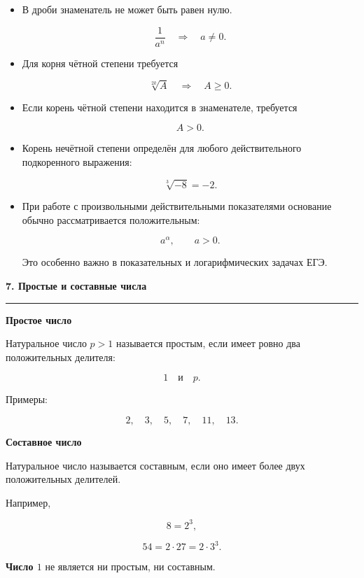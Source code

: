 \documentclass[a4paper,12pt]{article}
\newcommand{\MainSection}[1]{%
  \vspace{0.7em}
  {\Large\bfseries\color{darkaccent}#1\par}
  \vspace{0.25em}
  {\color{accent}\rule{\linewidth}{0.6pt}}
  \vspace{0.5em}
}
\newcommand{\SubSection}[1]{%
  \vspace{0.5em}
  {\large\bfseries\color{accent}#1\par}
  \vspace{0.2em}
}
\newcommand{\important}[1]{\textbf{\color{darkaccent}#1}}
\begin{document}
\begin{itemize}

\item
В дроби знаменатель не может быть равен нулю.

\[
\frac1{a^n}
\quad\Longrightarrow\quad
a\ne0.
\]

\item
Для корня чётной степени требуется

\[
\sqrt[2k]{A}
\quad\Longrightarrow\quad
A\ge0.
\]

\item
Если корень чётной степени находится в знаменателе, требуется

\[
A>0.
\]

\item
Корень нечётной степени определён для любого действительного
подкоренного выражения:

\[
\sqrt[3]{-8}=-2.
\]

\item
При работе с произвольными действительными показателями
основание обычно рассматривается положительным:

\[
a^\alpha,
\qquad a>0.
\]

Это особенно важно в показательных и логарифмических задачах ЕГЭ.

\end{itemize}


\MainSection{7. Простые и составные числа}

\SubSection{Простое число}

Натуральное число \(p>1\) называется простым, если имеет ровно два
положительных делителя:

\[
1
\quad\text{и}\quad
p.
\]

Примеры:

\[
2,\quad3,\quad5,\quad7,\quad11,\quad13.
\]

\SubSection{Составное число}

Натуральное число называется составным, если оно имеет более двух
положительных делителей.

Например,

\[
8=2^3,
\]

\[
54=2\cdot27
=2\cdot3^3.
\]

\important{Число \(1\)} не является ни простым, ни составным.
\end{document}
